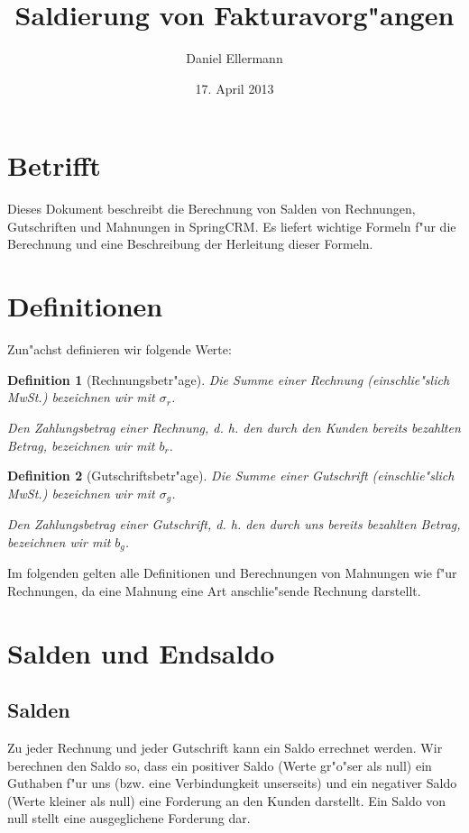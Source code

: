 \documentclass[a4paper]{article}
\title{Saldierung von Fakturavorg"angen}
\author{Daniel Ellermann}
\date{17. April 2013}
\numberwithin{equation}{section}
\newtheorem{dfn}{Definition}
\begin{document}
\maketitle
\tableofcontents



%
%
%
%
\section{Betrifft}
Dieses Dokument beschreibt die Berechnung von Salden von Rechnungen,
Gutschriften und Mahnungen in SpringCRM. Es liefert wichtige Formeln f"ur die
Berechnung und eine Beschreibung der Herleitung dieser Formeln.



%
%
%
%
\section{Definitionen}
Zun"achst definieren wir folgende Werte:
\begin{dfn}[Rechnungsbetr"age]
Die Summe einer Rechnung (einschlie"slich MwSt.) bezeichnen wir mit $\sigma_r$.

Den Zahlungsbetrag einer Rechnung, d. h. den durch den Kunden bereits bezahlten
Betrag, bezeichnen wir mit $b_r$.
\end{dfn}
\begin{dfn}[Gutschriftsbetr"age]
Die Summe einer Gutschrift (einschlie"slich MwSt.) bezeichnen wir mit
$\sigma_g$.

Den Zahlungsbetrag einer Gutschrift, d. h. den durch uns bereits bezahlten
Betrag, bezeichnen wir mit $b_g$.
\end{dfn}

\noindent Im folgenden gelten alle Definitionen und Berechnungen von Mahnungen 
wie f"ur Rechnungen, da eine Mahnung eine Art anschlie"sende Rechnung darstellt.



%
%
%
%
\section{Salden und Endsaldo}
\subsection{Salden}
Zu jeder Rechnung und jeder Gutschrift kann ein Saldo errechnet werden. Wir
berechnen den Saldo so, dass ein positiver Saldo (Werte gr"o"ser als null) ein
Guthaben f"ur uns (bzw. eine Verbindungkeit unserseits) und ein negativer Saldo 
(Werte kleiner als null) eine Forderung an den Kunden darstellt. Ein Saldo von
null stellt eine ausgeglichene Forderung dar.
\end{document}
